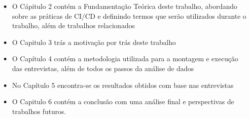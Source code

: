  \begin{itemize}
     \item O Cápitulo 2 contém a Fundamentação Teórica deste trabalho, abordando sobre as práticas de CI/CD e definindo termos que serão utilizados durante o trabalho, além de trabalhos relacionados
     \item O Capitulo 3 trás a motivação por trás deste trabalho
     \item O Capítulo 4 contém a metodologia utilizada para a montagem e execução das entrevistas, além de todos os passos da análise de dados
     \item No Capítulo 5 encontra-se os resultados obtidos com base nas entrevistas
     \item O Capitulo 6 contém a conclusão com uma análise final e perspectivas de trabalhos futuros.
 \end{itemize}
